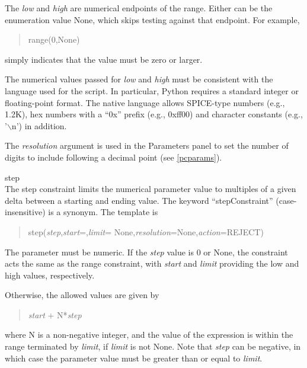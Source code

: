 \begin{description}
The {\it low} and {\it high} are numerical endpoints of the range. 
Either can be the enumeration value {\vt None}, which skips testing
against that endpoint.  For example,

\begin{quote}
{\vt range(0,None)}
\end{quote}

simply indicates that the value must be zero or larger.

The numerical values passed for {\it low} and {\it high} must be
consistent with the language used for the script.  In particular,
Python requires a standard integer or floating-point format.  The
native language allows SPICE-type numbers (e.g., {\vt 1.2K}), hex
numbers with a ``{\vt 0x}'' prefix (e.g., {\vt 0xff00}) and character
constants (e.g., {\vt '$\backslash$n'}) in addition.

The {\it resolution} argument is used in the {\cb Parameters} panel to
set the number of digits to include following a decimal point (see
\ref{pcparams}).

\item{\vt step}\\
The {\vt step} constraint limits the numerical parameter value to
multiples of a given delta between a starting and ending value.  The
keyword ``{\vt stepConstraint}'' (case-insensitive) is a synonym.  The
template is

\begin{quote}
{\vt step(}{\it step\/},{\it start\/}={},{\it limit\/}={\vt
 None},{\it resolution\/}={\vt None},{\it action\/}={\vt REJECT)}
\end{quote}

The parameter must be numeric.  If the {\it step} value is 0 or {\vt
None}, the constraint acts the same as the {\vt range} constraint,
with {\it start} and {\it limit} providing the low and high values,
respectively.

Otherwise, the allowed values are given by

\begin{quote}
{\it start} {\vt + N*}{\it step}
\end{quote}

where {\vt N} is a non-negative integer, and the value of the
expression is within the range terminated by {\it limit\/}, if {\it
limit} is not {\vt None}.  Note that {\it step} can be negative, in
which case the parameter value must be greater than or equal to {\it
limit\/}.


\end{description}
